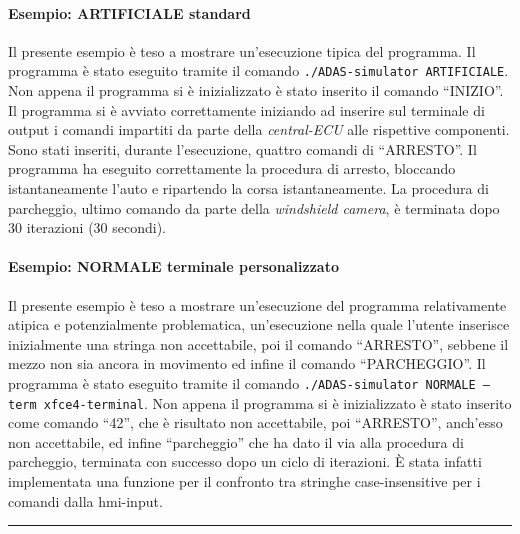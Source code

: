 \documentclass[11pt, openany]{article}
\theoremstyle{definition}
\theoremstyle{plain}
\theoremstyle{remark}
\begin{document}
		\paragraph{Esempio: ARTIFICIALE standard}
			Il presente esempio è teso a mostrare un'esecuzione tipica del programma.
			Il programma è stato eseguito tramite il comando \texttt{./ADAS-simulator ARTIFICIALE}. Non appena il programma si è inizializzato è stato inserito il comando ``INIZIO''. Il programma si è avviato correttamente iniziando ad inserire sul terminale di output i comandi impartiti da parte della \textit{central-ECU} alle rispettive componenti. Sono stati inseriti, durante l'esecuzione, quattro comandi di ``ARRESTO''. Il programma ha eseguito correttamente la procedura di arresto, bloccando istantaneamente l'auto e ripartendo la corsa istantaneamente. La procedura di parcheggio, ultimo comando da parte della \textit{windshield camera}, è terminata dopo 30 iterazioni (30 secondi).

		\paragraph{Esempio: NORMALE terminale personalizzato}
			Il presente esempio è teso a mostrare un'esecuzione del programma relativamente atipica e potenzialmente problematica, un'esecuzione nella quale l'utente inserisce inizialmente una stringa non accettabile, poi il comando ``ARRESTO'', sebbene il mezzo non sia ancora in movimento ed infine il comando ``PARCHEGGIO''.
			Il programma è stato eseguito tramite il comando \texttt{./ADAS-simulator NORMALE --term xfce4-terminal}. Non appena il programma si è inizializzato è stato inserito come comando ``42'', che è risultato non accettabile, poi ``ARRESTO'', anch'esso non accettabile, ed infine ``parcheggio'' che ha dato il via alla procedura di parcheggio, terminata con successo dopo un ciclo di iterazioni. È stata infatti implementata una funzione per il confronto tra stringhe case-insensitive per i comandi dalla hmi-input.

	\newpage
	\hrule
	\tableofcontents
\end{document}
